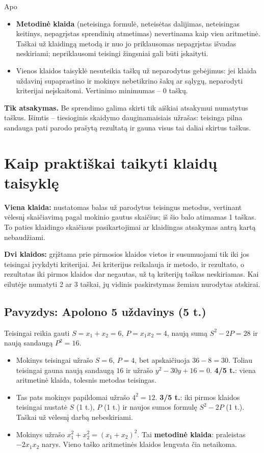 Apo\documentclass[11pt,a4paper]{article}
\begin{document}
\begin{itemize}
\item \textbf{Metodinė klaida} (neteisinga formulė, neteisėtas dalijimas, neteisingas keitinys, nepagrįstas sprendinių atmetimas) nevertinama kaip vien aritmetinė. Taškai už klaidingą metodą ir nuo jo priklausomas nepagrįstas išvadas neskiriami; nepriklausomi teisingi žingsniai gali būti įskaityti.
\item Vienos klaidos taisyklė nesuteikia taškų už neparodytus gebėjimus: jei klaida uždavinį supaprastino ir mokinys nebetikrino šakų ar sąlygų, neparodyti kriterijai neįskaitomi. Vertinimo minimumas -- 0 taškų.
\end{itemize}

\textbf{Tik atsakymas.} Be sprendimo galima skirti tik aiškiai atsakymui numatytus taškus. Išimtis -- tiesioginis skaidymo dauginamaisiais užrašas: teisinga pilna sandauga pati parodo prašytą rezultatą ir gauna visus tai daliai skirtus taškus.

\newpage
\section*{Kaip praktiškai taikyti klaidų taisyklę}
\textbf{Viena klaida:} nustatomas balas už parodytus teisingus metodus, vertinant vėlesnį skaičiavimą pagal mokinio gautus skaičius; iš šio balo atimamas 1 taškas. To paties klaidingo skaičiaus pasikartojimai ar klaidingas atsakymas antrą kartą nebaudžiami.

\textbf{Dvi klaidos:} grįžtama prie pirmosios klaidos vietos ir susumuojami tik iki jos teisingai įvykdyti kriterijai. Jei kriterijus reikalauja ir metodo, ir rezultato, o rezultatas iki pirmos klaidos dar negautas, už tą kriterijų taškas neskiriamas. Kai eilutėje numatyti 2 ar 3 taškai, jų vidinis paskirstymas žemiau nurodytas atskirai.

\subsection*{Pavyzdys: Apolono 5 uždavinys (5 t.)}
Teisingai reikia gauti $S=x_1+x_2=6$, $P=x_1x_2=4$, naują sumą $S^2-2P=28$ ir naują sandaugą $P^2=16$.
\begin{itemize}
\item Mokinys teisingai užrašo $S=6$, $P=4$, bet apskaičiuoja $36-8=30$. Toliau teisingai gauna naują sandaugą $16$ ir užrašo $y^2-30y+16=0$. \textbf{4/5 t.}: viena aritmetinė klaida, tolesnis metodas teisingas.
\item Tas pats mokinys papildomai užrašo $4^2=12$. \textbf{3/5 t.}: iki pirmos klaidos teisingai nustatė $S$ (1 t.), $P$ (1 t.) ir naujos sumos formulę $S^2-2P$ (1 t.). Taškai už vėlesnį darbą nebeskiriami.
\item Mokinys užrašo $x_1^2+x_2^2=(x_1+x_2)^2$. Tai \textbf{metodinė klaida}: praleistas $-2x_1x_2$ narys. Vieno taško aritmetinės klaidos lengvata čia netaikoma.
\end{itemize}
\end{document}
